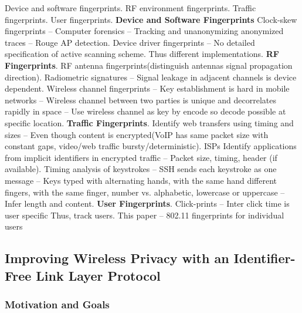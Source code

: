 \documentclass[9pt]{extarticle}
\begin{document}
\begin{multicols}{2}
Device and software fingerprints. RF environment fingerprints. Traffic fingerprints. User fingerprints. \textbf{Device and Software Fingerprints} Clock-skew fingerprints – Computer forensics – Tracking and unanonymizing anonymized traces – Rouge AP detection. Device driver fingerprints – No detailed specification of active scanning scheme. Thus different implementations. \textbf{RF Fingerprints}. RF antenna fingerprints(distinguish antennas signal propagation direction). Radiometric signatures – Signal leakage in adjacent channels is device dependent. Wireless channel fingerprints – Key establishment is hard in mobile networks – Wireless channel between two parties is unique and decorrelates rapidly in space – Use wireless channel as key by encode so decode possible at specific location. \textbf{Traffic Fingerprints}. Identify web transfers using timing and sizes – Even though content is encrypted(VoIP has same packet size with constant gaps, video/web traffic bursty/deterministic). ISPs Identify applications from implicit identifiers in encrypted traffic – Packet size, timing, header (if available). Timing analysis of keystrokes – SSH sends each keystroke as one message – Keys typed with alternating hands, with the same hand different fingers, with the same finger, number vs. alphabetic, lowercase or uppercase – Infer length and content. \textbf{User Fingerprints}. Click-prints – Inter click time is user specific Thus, track users. This paper – 802.11 fingerprints for individual users

\subsection{Improving Wireless Privacy with an Identifier-Free Link Layer Protocol}

\subsubsection{Motivation and Goals}


\end{multicols}
\end{document}
